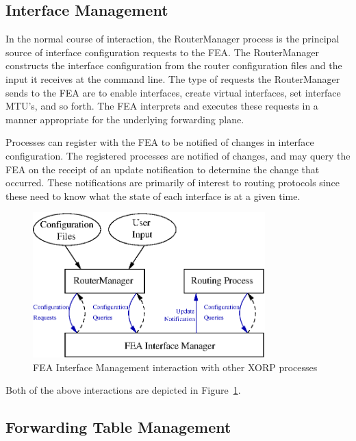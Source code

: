 \documentclass[11pt]{article}
\begin{document}
\subsection{Interface Management}
\label{sec:introduction:interface_management}

In the normal course of interaction, the RouterManager process is the
principal source of interface configuration requests to the FEA.  The
RouterManager constructs the interface configuration from the router
configuration files and the input it receives at the command line.
The type of requests the RouterManager sends to the FEA are to enable
interfaces, create virtual interfaces, set interface MTU's, and so
forth.  The FEA interprets and executes these requests in a manner
appropriate for the underlying forwarding plane.

Processes can register with the FEA to be notified of changes in
interface configuration.  The registered processes are notified of
changes, and may query the FEA on the receipt of an update notification
to determine the change that occurred.  These notifications are
primarily of interest to routing protocols since these need to know
what the state of each interface is at a given time.

\begin{figure}[htbp]
  \begin{center}
    \includegraphics[width=0.80\textwidth]{figs/ifmgmt}
    \caption{FEA Interface Management interaction with other XORP processes}
    \label{fig:ifmgmt}
  \end{center}
\end{figure}

Both of the above interactions are depicted in Figure~\ref{fig:ifmgmt}.

\subsection{Forwarding Table Management}
\label{sec:introduction:forwarding_table_management}
\end{document}

